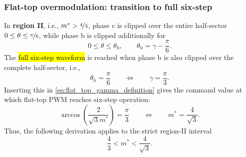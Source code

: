\begin{frame}
    \frametitle{Flat-top overmodulation: transition to full six-step}
    In \textbf{region II}, i.e., $m^*>\nicefrac{4}{3}$, phase \(\mathrm{c}\) is clipped over the entire half-sector \(0\leq \theta\leq \nicefrac{\pi}{6}\), while phase \(\mathrm{b}\) is clipped additionally for
    \begin{equation}
        0\leq \theta\leq \theta_\mathrm{b},
        \qquad
        \theta_\mathrm{b}=\gamma-\frac{\pi}{6}.
    \end{equation}\pause
    The \hl{full six-step waveform} is reached when phase \(\mathrm{b}\) is also clipped over the complete half-sector, i.e.,
    \begin{equation}
        \theta_\mathrm{b}=\frac{\pi}{6}
        \qquad \Leftrightarrow \qquad
        \gamma=\frac{\pi}{3}.
    \end{equation}\pause
    Inserting this in \eqref{eq:flat_top_gamma_definition} gives the command value at which flat-top PWM reaches six-step operation:
    \begin{equation}
        \arccos\!\left(\frac{2}{\sqrt{3}m^*}\right)=\frac{\pi}{3}
        \qquad \Leftrightarrow \qquad
        m^*=\frac{4}{\sqrt{3}}.
    \end{equation}\pause
    Thus, the following derivation applies to the strict region-II interval
    \begin{equation}
        \frac{4}{3}<m^*<\frac{4}{\sqrt{3}}.
    \end{equation}
\end{frame}

